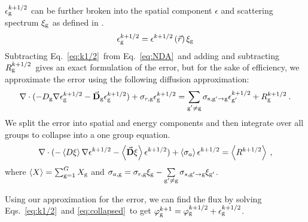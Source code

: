   $\epsilon_{\mathrm{g}}^{k + 1/2}$ can be further broken into the spatial component $\epsilon$ and scattering spectrum $\xi_{\mathrm{g}}$ as defined in \cite{morel-upscat,evans-upscat}.
  \begin{equation}
  \epsilon_{\mathrm{g}}^{k+1/2} = \epsilon^{k+1/2}\left(\vec{r}\right)\xi_{\mathrm{g}}
  \end{equation}
  Subtracting Eq.\ \eqref{eq:k1/2}\ from Eq.\ \eqref{eq:NDA}\ and adding and subtracting $R_{\mathrm{g}}^{k+1/2}$\ gives an exact formulation of the error, but for the sake of efficiency, we approximate the error using the following diffusion approximation:
  \begin{equation}
  \nabla\cdot(-D_{\mathrm{g}}  \nabla \epsilon_{\mathrm{g}}^{k+1/2} - \vec{\bf D}_{\mathrm{g}}
  \epsilon_{\mathrm{g}}^{k+1/2}) + \sigma_{r,\mathrm{g}}  \epsilon_{\mathrm{g}}^{k+1/2} =  \sum\limits_{\substack{{\mathrm{g}'}\neq\mathrm{g}}} \sigma_{\mathrm{s},\mathrm{g}' \to\mathrm{g}}  \epsilon_{\mathrm{g}'}^{k+1/2} + R^{k+1/2}_{\mathrm{g}} \:.
  \end{equation}
  We split the error into spatial and energy components and then integrate over all groups to collapse into a one group equation.
  \begin{equation}
  \nabla\cdot(-\left< D \xi \right> \nabla \epsilon^{k+1/2} - \left<\vec{\bf D} \xi
  \right> \epsilon^{k+1/2}) + \left< \sigma_{a} \right> \epsilon^{k+1/2} = \left< R^{k+1/2} \right> \:,\label{eq:collapsed}
  \end{equation}
  where $\left< X \right> = \sum_{\mathrm{g} = 1}^G X_{\mathrm{g}} $ and $\sigma_{a,\mathrm{g}}  = \sigma_{r,\mathrm{g}}\xi_{\mathrm{g}} - \sum\limits_{{\mathrm{g}'}\neq\mathrm{g}} \sigma_{s,\mathrm{g}'\rightarrow \mathrm{g}} \xi_{\mathrm{g}'}$.
  \par
  Using our approximation for the error, we can find the flux by solving Eqs.\ \eqref{eq:k1/2}\ and \eqref{eq:collapsed}\ to get $\varphi_{\mathrm{g}}^{k+1} = \varphi_{\mathrm{g}}^{k+1/2} + \epsilon_{\mathrm{g}}^{k+1/2}$.